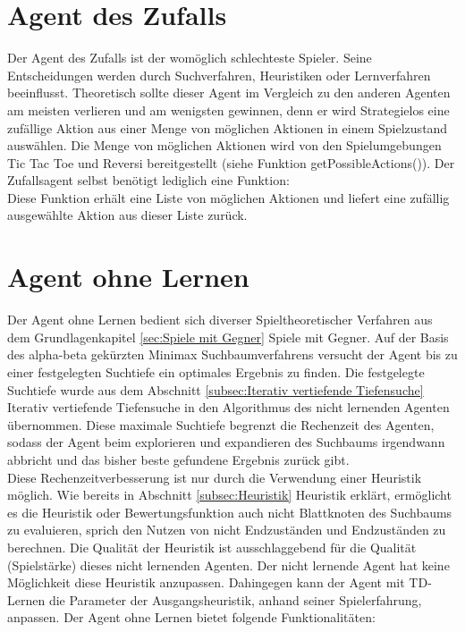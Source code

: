 \section{Agent des Zufalls}
Der Agent des Zufalls ist der womöglich schlechteste Spieler. Seine Entscheidungen werden durch Suchverfahren, Heuristiken oder Lernverfahren beeinflusst. Theoretisch sollte dieser Agent im Vergleich zu den anderen Agenten am meisten verlieren und am wenigsten gewinnen, denn er wird Strategielos eine zufällige Aktion aus einer Menge von möglichen Aktionen in einem Spielzustand auswählen. Die Menge von möglichen Aktionen wird von den Spielumgebungen Tic Tac Toe und Reversi bereitgestellt (siehe Funktion getPossibleActions()). Der Zufallsagent selbst benötigt lediglich eine Funktion:\\

Diese Funktion erhält eine Liste von möglichen Aktionen und liefert eine zufällig ausgewählte Aktion aus dieser Liste zurück.

\section{Agent ohne Lernen}
Der Agent ohne Lernen bedient sich diverser Spieltheoretischer Verfahren aus dem Grundlagenkapitel \ref{sec:Spiele mit Gegner} Spiele mit Gegner. Auf der Basis des alpha-beta gekürzten Minimax Suchbaumverfahrens versucht der Agent bis zu einer festgelegten Suchtiefe ein optimales Ergebnis zu finden. Die festgelegte Suchtiefe wurde aus dem Abschnitt \ref{subsec:Iterativ vertiefende Tiefensuche} Iterativ vertiefende Tiefensuche in den Algorithmus des nicht lernenden Agenten übernommen. Diese maximale Suchtiefe begrenzt die Rechenzeit des Agenten, sodass der Agent beim explorieren und expandieren des Suchbaums irgendwann abbricht und das bisher beste gefundene Ergebnis zurück gibt. \\

Diese Rechenzeitverbesserung ist nur durch die Verwendung einer Heuristik möglich. Wie bereits in Abschnitt \ref{subsec:Heuristik} Heuristik erklärt, ermöglicht es die Heuristik oder Bewertungsfunktion auch nicht Blattknoten des Suchbaums zu evaluieren, sprich den Nutzen von nicht Endzuständen und Endzuständen zu berechnen. Die Qualität der Heuristik ist ausschlaggebend für die Qualität (Spielstärke) dieses nicht lernenden Agenten. Der nicht lernende Agent hat keine Möglichkeit diese Heuristik anzupassen. Dahingegen kann der Agent mit TD-Lernen die Parameter der Ausgangsheuristik, anhand seiner Spielerfahrung, anpassen. Der Agent ohne Lernen bietet folgende Funktionalitäten:


